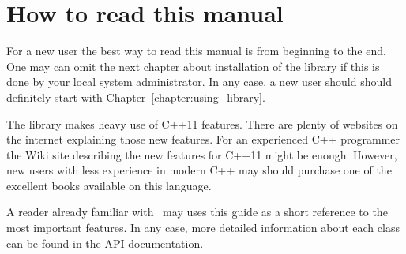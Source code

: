 \section{How to read this manual}

For a new user the best way to read this manual is from beginning to the end.
One may can omit the next chapter about installation of the library if this is
done by your local system administrator. In any case, a new user should should
definitely start with Chapter~\ref{chapter:using_library}.

The library makes heavy use of C++11 features. There are plenty of websites on
the internet explaining those new features. For an experienced C++ programmer 
the Wiki site\cite{web:cpp11wiki} describing the new features for C++11 might be
enough. However, new users with less experience in modern C++ may should
purchase one of the excellent books available on this language.

A reader already familiar with \libpnicore\ may uses this guide as a short
reference to the most important features. In any case, more detailed information
about each class can be found in the API documentation.



